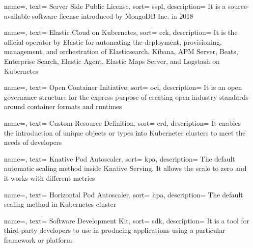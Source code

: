 {
  name=,
  text= Server Side Public License,
  sort= sspl,
  description= {It is a source-available software license introduced by MongoDB Inc. in 2018}
}

{
  name=,
  text= Elastic Cloud on Kubernetes,
  sort= eck,
  description= {It is the official operator by Elastic for automating the deployment, provisioning, management, and orchestration of Elasticsearch, Kibana, APM Server, Beats, Enterprise Search, Elastic Agent, Elastic Maps Server, and Logstash on Kubernetes}
}

{
  name=,
  text= Open Container Initiative,
  sort= oci,
  description= {It is an open governance structure for the express purpose of creating open industry standards around container formats and runtimes}
}

{
  name=,
  text= Custom Resource Definition,
  sort= crd,
  description= {It enables the introduction of unique objects or types into Kubernetes clusters to meet the needs of developers}
}

{
  name=,
  text= Knative Pod Autoscaler,
  sort= kpa,
  description= {The default automatic scaling method inside Knative Serving. It allows the scale to zero and it works with different metrics}
}

{
  name=,
  text= Horizontal Pod Autoscaler,
  sort= hpa,
  description= {The default scaling method in Kubernetes cluster}
}

{
  name=,
  text= Software Development Kit,
  sort= sdk,
  description= {It is a tool for third-party developers to use in producing applications using a particular framework or platform}
}

